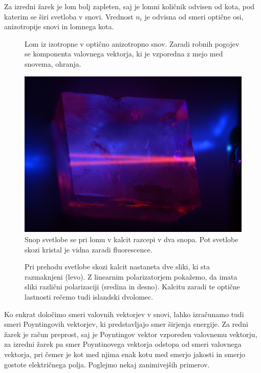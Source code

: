 Za izredni žarek je lom bolj zapleten, saj je lomni količnik odvisen od kota, pod
katerim se širi svetloba v snovi. 
Vrednost $n_i$ je odvisna od smeri optične osi, anizotropije snovi in lomnega kota.
\begin{figure}[h]
\centering
\def\svgwidth{70truemm} 

\caption{Lom iz izotropne v optično anizotropno snov. Zaradi robnih pogojev se
komponenta valovnega vektorja, ki je vzporedna z mejo med snovema, ohranja. }
\label{fig:10_dvolom_1}
\end{figure}
\begin{figure}[ht]
\centering
\includegraphics[width=9truecm]{slike/10_FotoDvolom2.jpg}
\caption{Snop svetlobe se pri lomu v kalcit razcepi v dva snopa. Pot svetlobe skozi 
kristal je vidna zaradi fluorescence.}
\label{fig:10_dvolom_2}
\end{figure}
\begin{figure}[h!]
\centering
\def\svgwidth{140truemm} 

\caption{Pri prehodu svetlobe skozi kalcit nastaneta dve sliki, ki sta razmaknjeni (levo). 
Z linearnim polarizatorjem pokažemo, da imata sliki različni polarizaciji (sredina in desno). 
Kalcitu zaradi te optične lastnosti rečemo tudi islandski dvolomec.
}
\label{fig:10_dvolom_2}
\end{figure}

Ko enkrat določimo smeri valovnih vektorjev v snovi, lahko izračunamo tudi 
smeri Poyntingovih vektorjev, ki predstavljajo smer širjenja energije. Za redni 
žarek je račun preprost, saj je Poyntingov vektor vzporeden valovnemu vektorju, za 
izredni žarek pa smer Poyntinovega vektorja odstopa od smeri valovnega vektorja, pri 
čemer je kot med njima enak kotu med smerjo jakosti in smerjo gostote električnega polja. 
Poglejmo nekaj zanimivejših primerov.


